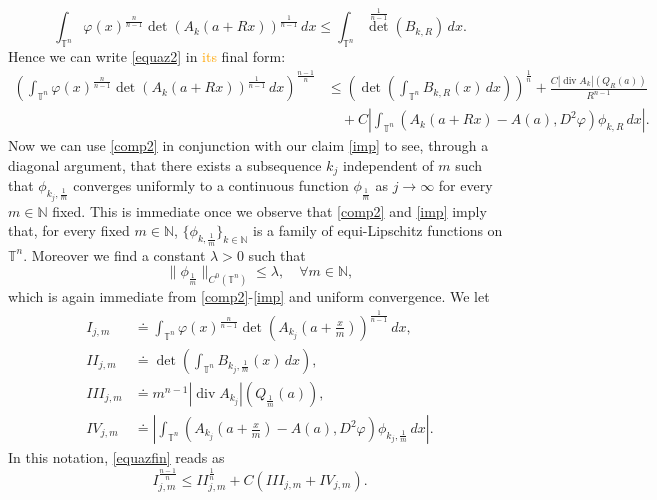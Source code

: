 \documentclass[10pt,reqno]{amsart}
\numberwithin{equation}{section}
\newcommand{\T}{\mathbb{T}}
\newcommand{\N}{\mathbb{N}}
\DeclareMathOperator{\dv}{div}
\theoremstyle{plain}
\theoremstyle{definition}
\theoremstyle{remark}
\begin{document}
\begin{equation}\label{Mon1}
\int_{\T^n} \varphi(x)^{\frac{n}{n-1}}\det(A_{k}(a+Rx))^\frac{1}{n - 1}\,dx \le \int_{\T^n}{\det}^\frac{1}{n-1}(B_{k,R})\,dx.
\end{equation}
Hence we can write \eqref{equaz2} in \textcolor{orange}{its} final form:
\begin{equation}\label{equazfin}
\begin{split}
\left(\int_{\T^n}\varphi(x)^{\frac{n}{n-1}}\det(A_{k}(a+Rx))^\frac{1}{n - 1}\,dx\right)^\frac{n - 1}{n} &\le \left(\det\left(\int_{\T^n}B_{k,R}(x)\,dx\right)\right)^{\frac{1}{n}} +\frac{C|\dv A_k|( Q_R(a))}{R^{n-1}}\\
& \quad +C\left|\int_{\T^n}(A_k(a + Rx) -A(a),D^2\varphi) \phi_{k,R}\,dx\right|.
\end{split}
\end{equation}
Now we can use \eqref{comp2} in conjunction with our claim \eqref{imp} to see, through a diagonal argument, that there exists a subsequence $k_j$ independent of $m$ such that  $\phi_{k_j,\frac{1}{m}}$ converges uniformly to a continuous function $\phi_{\frac{1}{m}}$ as $j \to \infty$ for every $m \in \N$ fixed. This is immediate once we observe that \eqref{comp2} and \eqref{imp} imply that, for every fixed $m\in \N$,  $\{\phi_{k,\frac{1}{m}}\}_{k \in \N}$ is a family of equi-Lipschitz functions on $\T^n$. Moreover we find a constant $\lambda > 0$ such that
\begin{equation}\label{unif}
\|\phi_{\frac{1}{m}}\|_{C^0(\T^n)} \le \lambda, \quad \forall m \in \N,
\end{equation}
which is again immediate from \eqref{comp2}-\eqref{imp} and uniform convergence. We let
\begin{align*}
I_{j,m} &\doteq \int_{\T^n}\varphi(x)^{\frac{n}{n-1}}\det\left(A_{k_j}\left(a+\frac{x}{m}\right)\right)^\frac{1}{n - 1}\,dx,\\
II_{j,m} &\doteq \det\left(\int_{\T^n}B_{k_j,\frac{1}{m}}(x)\,dx\right),\\
III_{j,m} &\doteq  m^{n-1}|\dv A_{k_j}|(Q_\frac{1}{m}(a)),\\
IV_{j,m} &\doteq \left|\int_{\T^n}\left(A_{k_j}\left(a + \frac{x}{m}\right) -A(a),D^2\varphi\right) \phi_{k_j,\frac{1}{m}}\,dx\right|.
\end{align*}
In this notation, \eqref{equazfin} reads as
\begin{equation}\label{IIII}
I_{j,m}^\frac{n-1}{n} \le II^\frac{1}{n}_{j,m} + C(III_{j,m} + IV_{j,m}).
\end{equation}
\end{document}
